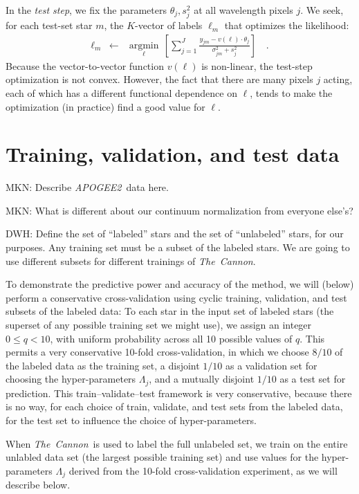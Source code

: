 \documentclass[12pt,preprint]{aastex}
\newcommand{\project}[1]{\textsl{#1}}
\newcommand{\thecannon}{\project{The~Cannon}}
\newcommand{\acronym}[1]{\small{#1}}
\newcommand{\apogee}{\project{\acronym{APOGEE2}}}
\newcommand{\argmin}[1]{\underset{#1}{\operatorname{argmin}}\,}
\begin{document}
In the \emph{test step}, we fix the parameters $\theta_j,s^2_j$ at all
wavelength pixels $j$.
We seek, for each test-set star $m$, the $K$-vector of labels $\ell_m$
that optimizes the likelihood:
\begin{eqnarray}
  \ell_m &\leftarrow& \argmin{\ell}\left[
    \sum_{j=1}^J \frac{y_{jm}-v(\ell)\cdot\theta_j}{\sigma^2_{jm}+s^2_j}
    \right]
  \quad .
\end{eqnarray}
Because the vector-to-vector function $v(\ell)$ is non-linear, the
test-step optimization is not convex.
However, the fact that there are many pixels $j$ acting, each of which
has a different functional dependence on $\ell$, tends to make the
optimization (in practice) find a good value for $\ell$.

\section{Training, validation, and test data}

MKN: Describe \apogee\ data here.

MKN: What is different about our continuum normalization from everyone else's?

DWH: Define the set of ``labeled'' stars and the set of ``unlabeled''
stars, for our purposes.  Any training set must be a subset of the
labeled stars.
We are going to use different subsets for different trainings of \thecannon.

To demonstrate the predictive power and accuracy of the method, we
will (below) perform a conservative cross-validation using cyclic
training, validation, and test subsets of the labeled data:
To each star in the input set of labeled stars (the superset of any
possible training set we might use), we assign an integer $0\leq
q<10$, with uniform probability across all 10 possible values of $q$.
This permits a very conservative 10-fold cross-validation, in which we
choose $8/10$ of the labeled data as the training set, a disjoint
$1/10$ as a validation set for choosing the hyper-parameters
$\Lambda_j$, and a mutually disjoint $1/10$ as a test set for
prediction.
This train--validate--test framework is very conservative, because there
is no way, for each choice of train, validate, and test sets from the
labeled data, for the test set to influence the choice of
hyper-parameters.

When \thecannon\ is used to label the full unlabeled set, we train on
the entire unlabled data set (the largest possible training set) and
use values for the hyper-parameters $\Lambda_j$ derived from the
10-fold cross-validation experiment, as we will describe below.
\end{document}
